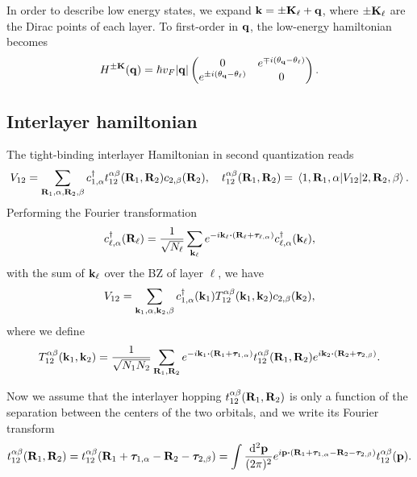 In order to describe low energy states, we expand ${\vb{k}} = \pm {\vb{K}}_\ell + {\vb{q}}$, where $\pm {\vb{K}}_\ell$ are the Dirac points of each layer. To first-order in ${\vb{q}}$, the low-energy hamiltonian becomes
\begin{equation} \label{eq:blg-eachlayer-hamil-lowenergy}
H^{\pm {\vb{K}}}({\vb{q}}) = \hbar v_F \abs{{\vb{q}}}
\begin{pmatrix}
0 & e^{\mp i (\theta_{\vb{q}} - \theta_\ell)} \\
e^{\pm i (\theta_{\vb{q}} - \theta_\ell)} & 0
\end{pmatrix}.
\end{equation}


\subsection{Interlayer hamiltonian}

The tight-binding interlayer Hamiltonian in second quantization reads
\begin{equation} \label{eq:interlayer-hopping}
V_{12} = \sum_{{\vb{R}}_1,\alpha,{\vb{R}}_2,\beta} c_{1,\alpha}^{\dagger} t_{12}^{\alpha\beta}({\vb{R}}_1,{\vb{R}}_2) c_{2,\beta}({\vb{R}}_2), \quad
t_{12}^{\alpha\beta}({\vb{R}}_1,{\vb{R}}_2) =
\mel{1,{\vb{R}}_1,\alpha}{V_{12}}{2,{\vb{R}}_2,\beta}.
\end{equation}
Performing the Fourier transformation
\begin{equation} \label{eq:blg-fourier}
c_{\ell,\alpha}^\d(\R_\ell) = \frac{1}{\sqrt{N_\ell}} \sum_{\k_\ell}
e^{-i\k_\ell \vdot (\R_\ell + \vtau_{\ell,\alpha})} c_{\ell,\alpha}^\d(\k_\ell),
\end{equation}
with the sum of ${\vb{k}}_\ell$ over the BZ of layer $\ell$, we have
\begin{equation} \label{eq:interlayer-hopping-kspace}
V_{12} = \sum_{{\vb{k}}_1,\alpha,{\vb{k}}_2,\beta} c_{1,\alpha}^{\dagger}({\vb{k}}_1) T_{12}^{\alpha\beta}({\vb{k}}_1,{\vb{k}}_2) c_{2,\beta}({\vb{k}}_2),
\end{equation}
where we define
\begin{equation} \label{eq:interlayer-hopping-Tkspace}
T_{12}^{\alpha\beta}(\k_1,\k_2) =
\frac{1}{\sqrt{N_1 N_2}} \sum_{\R_1,\R_2} e^{-i\k_1\vdot(\R_1+\vtau_{1,\alpha})}
t_{12}^{\alpha\beta}(\R_1,\R_2) e^{i\k_2\vdot(\R_2+\vtau_{2,\beta})}.
\end{equation}

Now we assume that the interlayer hopping $t_{12}^{\alpha\beta}({\vb{R}}_1,{\vb{R}}_2)$ is only a function of the separation between the centers of the two orbitals, and we write its Fourier transform
\begin{equation} \label{eq:interlayer-hopping-fourier}
t_{12}^{\alpha\beta}(\R_1,\R_2) = t_{12}^{\alpha\beta}(\R_1+\vtau_{1,\alpha}-\R_2-\vtau_{2,\beta}) =
\int \frac{\dd[2]{\p}}{(2\pi)^2} e^{i \p \vdot (\R_1+\vtau_{1,\alpha}-\R_2-\vtau_{2,\beta})} t_{12}^{\alpha\beta}(\p).
\end{equation}

